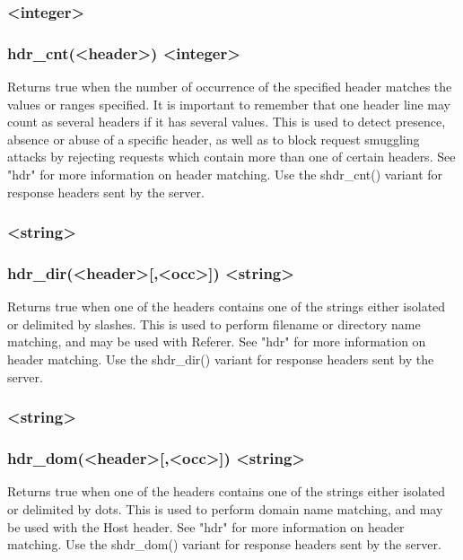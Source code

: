 \subsubsection[hdr\_cnt]{ <integer>}
\subsubsection*{hdr\_cnt(<header>) <integer>}

  Returns true when the number of occurrence of the specified header matches
  the values or ranges specified. It is important to remember that one header
  line may count as several headers if it has several values. This is used to
  detect presence, absence or abuse of a specific header, as well as to block
  request smuggling attacks by rejecting requests which contain more than one
  of certain headers. See "hdr" for more information on header matching. Use
  the shdr\_cnt() variant for response headers sent by the server.

\subsubsection[hdr\_dir]{ <string>}
\subsubsection*{hdr\_dir(<header>[,<occ>]) <string>}

  Returns true when one of the headers contains one of the strings either
  isolated or delimited by slashes. This is used to perform filename or
  directory name matching, and may be used with Referer. See "hdr" for more
  information on header matching. Use the shdr\_dir() variant for response
  headers sent by the server.

\subsubsection[hdr\_dom]{ <string>}
\subsubsection*{hdr\_dom(<header>[,<occ>]) <string>}

  Returns true when one of the headers contains one of the strings either
  isolated or delimited by dots. This is used to perform domain name matching,
  and may be used with the Host header. See "hdr" for more information on
  header matching. Use the shdr\_dom() variant for response headers sent by the
  server.

